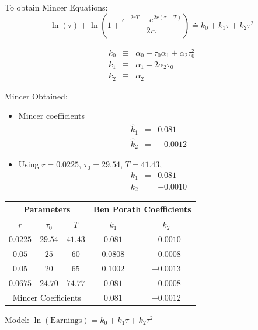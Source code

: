 \documentclass[12pt,compress,handout]{beamer}  %
\begin{document}
\begin{frame}
To obtain Mincer Equations:
\begin{equation*}
    \ln \left( \tau \right) +\ln \left( 1+\frac{e^{-2rT}-e^{2r(\tau
-T)}}{2r\tau }\right) \doteq k_{0}+k_{1}\tau +k_{2}\tau ^{2}
\end{equation*}

\begin{eqnarray*}
k_{0} &\equiv &\alpha _{0}-\tau _{0}\alpha _{1}+\alpha _{2}\tau _{0}^{2} \\
k_{1} &\equiv &\alpha _{1}-2\alpha _{2}\tau _{0} \\
k_{2} &\equiv &\alpha _{2}
\end{eqnarray*}
\end{frame}


\begin{frame}
Mincer Obtained:

\begin{itemize}
\item
Mincer coefficients
\begin{eqnarray*}
  \hat{k}_{1} &=& 0.081 \\
  \hat{k}_{2} &=& -0.0012
\end{eqnarray*}

\item
Using $r=0.0225$, $\tau _{0}=29.54$, $T=41.43$,
\begin{eqnarray*}
  k_{1} &=& 0.081 \\
  k_{2} &=& -0.0010
\end{eqnarray*}
\end{itemize}
\end{frame}


\begin{frame}
\begin{center}
\begin{tabular}{ccc||cc}
\multicolumn{3}{c||}{Parameters} & \multicolumn{2}{c}{Ben Porath
Coefficients} \\ \hline\hline $r$ & $\tau _{0}$ & $T$ & $k_{1}$ &
$k_{2}$ \\ \hline $0.0225$ & $29.54$ & $41.43$ & $0.081$ & $-0.0010$
\\ \hline $0.05$ & $25$ & $60$ & $0.0808$ & $-0.0008$ \\ \hline
$0.05$ & $20$ & $65$ & $0.1002$ & $-0.0013$ \\ \hline $0.0675$ &
$24.70$ & $74.77$ & $0.081$ & $-0.0008$ \\ \hline\hline
\multicolumn{3}{c}{Mincer Coefficients} & $0.081$ & $-0.0012$ \\
\hline
\end{tabular}

\bigskip

Model: $\ln ( \text{Earnings} ) =k_{0}+k_{1}\tau +k_{2}\tau^{2}$
\end{center}
\end{frame}
\end{document}
